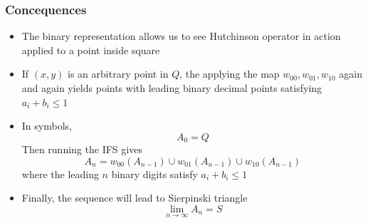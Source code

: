 \documentclass{beamer}
\begin{document}

\begin{frame}
    \frametitle{Concequences}
    \begin{itemize}
        \item The binary representation allows us to see Hutchinson operator in action applied to a point inside square
        \item If $(x,y)$ is an arbitrary point in $Q$, the applying the map $w_{00},w_{01},w_{10}$ again and again yields points with leading binary decimal points satisfying $a_i + b_i \leq 1$
        \item In symbols,
        \begin{equation*}
            A_0 = Q
        \end{equation*} 
        Then running the IFS gives 
        \begin{equation*}
            A_n = w_{00}(A_{n-1}) \cup w_{01}(A_{n-1}) \cup w_{10}(A_{n-1})
        \end{equation*}
        where the leading $n$ binary digits satisfy $a_i + b_i \leq 1$
        \item Finally, the sequence will lead to Sierpinski triangle
        \begin{equation*}
            \lim_{n \to \infty} A_n = S
        \end{equation*}
    \end{itemize}
\end{frame}
\end{document}
